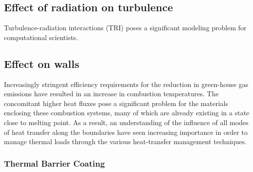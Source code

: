 \subsection{Effect of radiation on turbulence}
Turbulence-radiation interactions (TRI) poses a significant modeling problem for computational scientists. 

\subsection{Effect on walls}
Increasingly stringent efficiency requirements for the reduction in green-house gas emissions have resulted in an increase in combustion temperatures. 
The concomitant higher heat fluxes pose a significant problem for the materials enclosing these combustion systems, many of which are already existing in a state close to melting point. 
As a result, an understanding of the influence of all modes of heat transfer along the boundaries have seen increasing importance in order to manage thermal loads through the various heat-transfer management techniques.

\subsubsection{Thermal Barrier Coating}
